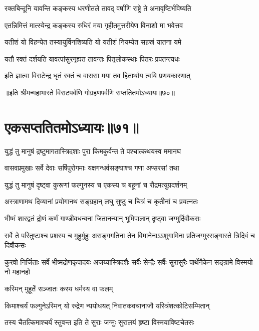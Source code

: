 \twolineshloka
{रक्तबिन्दूनि यावन्ति कङ्कस्य धरणीतले}
{तावद् वर्षाणि राष्ट्रे ते अनावृष्टिर्भविष्यति}


\twolineshloka
{एतन्निमित्तं मात्स्येन्द्र कङ्कस्य रुधिरं मया}
{गृहीतमुत्तरीयेण विनाशो मा भवेत्तव}


\twolineshloka
{यतीशं यो विहन्येत तस्यायुर्विनशिष्यति}
{यो यतीशं नियम्येत सहस्रं यातना यमे}


\twolineshloka
{यतौ रक्तं दर्शयति यावत्पांसुरगृह्यत}
{तावन्तः पितृलोकस्थाः पितरः प्रपतन्त्यधः}


\twolineshloka
{इति ज्ञात्वा विराटेन्द्र धृतं रक्तं च वाससा}
{मया तव हितार्थाय त्वयि प्रणयकारणात्}

॥इति श्रीमन्महाभारते विराटपर्वणि गोग्रहणपर्वणि सप्ततितमोऽध्यायः॥७०॥

\chapter{एकसप्ततितमोऽध्यायः॥७१॥}

\twolineshloka
{युद्धं तु मानुषं द्रष्टुमागतास्त्रिदशाः पुरा}
{किमकुर्वन्त ते पश्चात्कथयस्व ममानघ}



\twolineshloka
{वासवप्रमुखाः सर्वे देवाः सर्षिपुरोगमाः}
{यक्षगन्धर्वसङ्घाश्च गणा अप्सरसां तथा}


\twolineshloka
{युद्धं तु मानुषं दृष्ट्वा कुरूणां फल्गुनस्य च}
{एकस्य च बहूनां च रौद्रमत्युग्रदर्शनम्}


\twolineshloka
{अस्त्राणामथ दिव्यानां प्रयोगानथ सङ्ग्रहान्}
{लघु सुष्ठु च चित्रं च कृतीनां च प्रयत्नतः}


\twolineshloka
{भीष्मं शारद्वतं द्रोणं कर्णं गाण्डीवधन्वना}
{जितानन्यान् भूमिपालान् दृष्ट्वा जग्मुर्दिवौकसः}


\threelineshloka
{सर्वे ते परितुष्टाश्च प्रशस्य च मुहुर्मुहुः}
{असङ्गगतिना तेन विमानेनाऽऽशुगामिना}
{प्रतिजग्मुरसङ्गास्ते त्रिदिवं च दिवौकसः}


\threelineshloka
{कुरवो निर्जिताः सर्वे भीष्मद्रोणकृपादयः}
{अजय्यास्त्रिदशैः सर्वैः सेन्द्रैः सर्वैः सुरासुरैः}
{पार्थेनैकेन सङ्ग्रामे विस्मयो नो महानहो}


\onelineshloka
{कस्मिन् मुहूर्ते सञ्जातः कस्य धर्मस्य वा फलम्}

\twolineshloka
{किमाश्चर्यं फल्गुनेऽस्मिन् यो रुद्रेण न्ययोधयत्}
{निवातकवचानाजौ यस्त्रिंशत्कोटिसम्मितान्}


\twolineshloka
{तस्य चैतत्किमाश्चर्यं स्तुवन्त इति ते सुराः}
{जग्मुः सुरालयं हृष्टा विस्मयाविष्टचेतसः}



